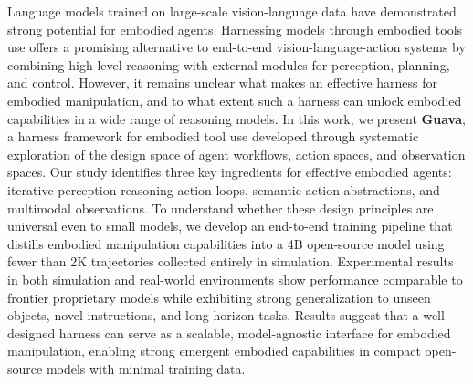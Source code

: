 

Language models trained on large-scale vision-language data have demonstrated strong potential for embodied agents. Harnessing models through embodied tools use offers a promising alternative to end-to-end vision-language-action systems by combining high-level reasoning with external modules for perception, planning, and control. However, it remains unclear what makes an effective harness for embodied manipulation, and to what extent such a harness can unlock embodied capabilities in a wide range of reasoning models.
In this work, we present \textbf{Guava}, a harness framework for embodied tool use developed through systematic exploration of the design space of agent workflows, action spaces, and observation spaces. Our study identifies three key ingredients for effective embodied agents: iterative perception-reasoning-action loops, semantic action abstractions, and multimodal observations. To understand whether these design principles are universal even to small models, we develop an end-to-end training pipeline that distills embodied manipulation capabilities into a 4B open-source model using fewer than 2K trajectories collected entirely in simulation.
Experimental results in both simulation and real-world environments show performance comparable to frontier proprietary models while exhibiting strong generalization to unseen objects, novel instructions, and long-horizon tasks. 
Results suggest that a well-designed harness can serve as a scalable, model-agnostic interface for embodied manipulation, enabling strong emergent embodied capabilities in compact open-source models with minimal training data.




